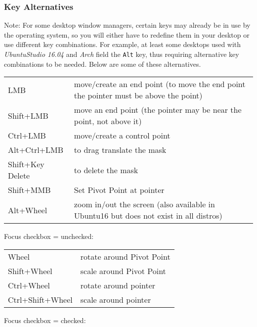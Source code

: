 \subsubsection*{Key Alternatives}%
\label{ssub:key_alternatives}

\vspace{2ex} Note: For some desktop window managers, certain keys may already be in use by the operating system, so you will either have to redefine them in your desktop or use different key combinations.  For example, at least some desktops used with \textit{UbuntuStudio 16.04} and \textit{Arch} field the \texttt{Alt} key, thus requiring alternative key combinations to be needed.  Below are some of these alternatives.

\vspace{2ex}
\begin{tabular}{ l p{11cm}}
    \hline			
    LMB & move/create an end point (to move the end point the pointer must be above the point) \\
    Shift+LMB & move an end point (the pointer may be near the point, not above it) \\
    Ctrl+LMB & move/create a control point \\
    Alt+Ctrl+LMB & to drag translate the mask \\
    Shift+Key Delete & to delete the mask \\
    Shift+MMB & Set Pivot Point at pointer \\
    Alt+Wheel & zoom in/out the screen (also available in Ubuntu16 but does not exist in all distros) \\
    \hline  
\end{tabular}

\vspace{2ex}
Focus checkbox = unchecked:

\vspace{2ex}
\begin{tabular}{ l  l }
    \hline			
    Wheel & rotate around Pivot Point \\
    Shift+Wheel & scale around Pivot Point \\
    Ctrl+Wheel & rotate around pointer \\
    Ctrl+Shift+Wheel & scale around pointer \\
    
    \hline  
\end{tabular}

\vspace{2ex}
Focus checkbox = checked:

